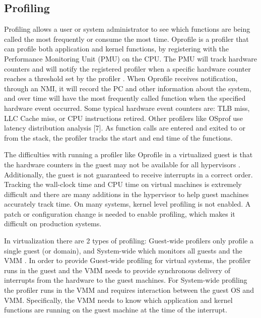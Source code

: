\subsection{Profiling}
Profiling allows a user or system administrator to see which functions are being called the most frequently or consume the most time.  Oprofile \cite{levon} is a profiler that can profile both application and kernel functions, by registering with the Performance Monitoring Unit (PMU) on the CPU.  The PMU will track hardware counters and will notify the registered profiler when a specific hardware counter reaches a threshold set by the profiler \cite{mucci}.  When Oprofile receives notification, through an NMI, it will record the PC and other information about the system, and over time will have the most frequently called function when the specified hardware event occurred.  Some typical hardware event counters are:  TLB miss, LLC Cache miss, or CPU instructions retired.   Other profilers like OSprof use latency distribution analysis [7].  As function calls are entered and exited to or from the stack, the profiler tracks the start and end time of the functions.


\indent The difficulties with running a profiler like Oprofile in a virtualized guest is that the hardware counters in the guest may not be available for all hypervisors \cite{buell1}.  Additionally, the guest is not guaranteed to receive interrupts in a correct order.   Tracking the wall-clock time and CPU time on virtual machines is extremely difficult and there are many additions in the hypervisor to help guest machines accurately track time.  On many systems, kernel level profiling is not enabled. A patch or configuration change is needed to enable profiling, which makes it difficult on production systems.

\indent In virtualization there are 2 types of profiling:  Guest-wide profilers only profile a single guest (or domain), and System-wide which monitors all guests and the VMM \cite{du1}.  In order to provide Guest-wide profiling for virtual systems, the profiler runs in the guest and the VMM needs to provide synchronous delivery of interrupts from the hardware to the guest machines.  For System-wide profiling the profiler runs in the VMM and requires interaction between the guest OS and VMM.  Specifically, the VMM needs to know which application and kernel functions are running on the guest machine at the time of the interrupt.

